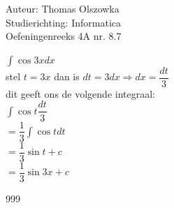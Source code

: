 \documentclass[a4paper]{article}
\newcommand{\dint}{\displaystyle\int}
\begin{document}
\noindent \large Auteur: Thomas Olszowka \\
\noindent \large Studierichting: Informatica \\
\noindent \large Oefeningenreeks 4A nr. 8.7  \\



\medskip

\normalsize

$\dint \cos 3x dx$ \\

stel $ t = 3x$ dan is $ dt = 3dx \Rightarrow dx = \dfrac{dt}{3}$ \\ 

dit geeft ons de volgende integraal: \\

$\dint \cos t \dfrac{dt}{3}$ \\

$= \dfrac{1}{3} \dint \cos t dt$ \\

$= \dfrac{1}{3} \sin t + c$ \\

$= \dfrac{1}{3} \sin 3x + c$\\

\begin{thebibliography}{999}
\end{thebibliography}
\end{document}
